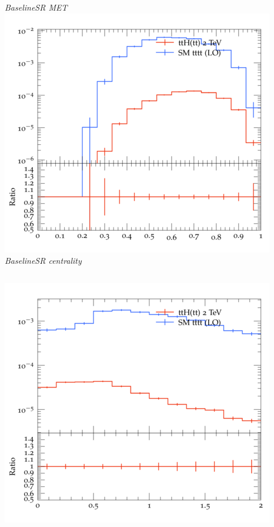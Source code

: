 \documentclass{beamer}
\begin{document}
\begin{frame}
\begin{columns}
\textit{\small BaselineSR MET}
\includegraphics[width=\textwidth]{../plots/ttH_2000/tttt_ttH_1LOS/BaselineSR_centrality.png}\\
\textit{\small BaselineSR centrality}
\end{columns}
\begin{columns}
\includegraphics[width=\textwidth]{../plots/ttH_2000/tttt_ttH_1LOS/BaselineSR_deltaR_bl_min.png}\\

\end{columns}
\end{frame}
\end{document}
